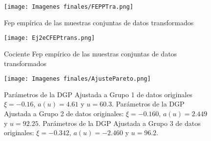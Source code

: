 \documentclass[10.5pt,notitlepage]{article}
\theoremstyle{plain}
\begin{document}
\begin{figure}[h]
    \centering
    \texttt{[image: Imagenes finales/FEPPTra.png]}
    \caption{Fep empírica de las muestras conjuntas de datos transformados}
    \label{Ej2eFEPtrans}
\end{figure}

\begin{figure}[h]
    \centering
    \texttt{[image: Ej2eCFEPtrans.png]}
    \caption{Cociente Fep empírico de las muestras conjuntas de datos transformados}
    \label{ZEj2eCFEPtransZ}
\end{figure}


\begin{figure}[htb]
    \centering
    \texttt{[image: Imagenes finales/AjustePareto.png]}
    \caption{Parámetros de la DGP Ajustada a Grupo 1 de datos originales \(\xi =-0.16\), \(a(u)=4.61\) y \(u = 60.3\). Parámetros de la DGP Ajustada a Grupo 2 de datos originales: \(\xi = -0.160\), \(a(u)=2.449\) y \(u = 92.25\).  Parámetros de la DGP Ajustada a Grupo 3 de datos originales: \(\xi =-0.342 \), \(a(u)=-2.460 \) y \(u = 96.2\).}
    \label{Mon1DGP} 
\end{figure}

\begin{comment}
\begin{figure}[h]
    \centering
    \texttt{[image: .png]}
    \caption{FEP empírica de las muestras conjuntas de los meses. Datos negativos.}
    \label{mEj2eFEP}
\end{figure}
\begin{figure}[h]
    \centering
    \texttt{[image: ]}
    \caption{Cociente FEP empírico de las muestras conjuntas de los meses. Datos negativos.}
    \label{mEj2eCFEP}
\end{figure}


\begin{figure}[h]
    \centering
    \texttt{[image: .png]}
    \caption{FEP empírico de las muestras conjuntas de los meses. Datos negativos.}
    \label{mEj2eCFEPZoom}
\end{figure}

\begin{figure}[h]
    \centering
    \texttt{[image: .png]}
    \caption{Cociente Fep empírico de las muestras conjuntas de datos transformados. Datos negativos.}
    \label{mEj2eCFEPtrans}
\end{figure}


\begin{figure}[htb]
    \centering
    \texttt{[image: .png]}
    \caption{Parámetros de la DGP Ajustada a Grupo 1 de datos negativos \(\xi =-0.16\), \(a(u)=4.61\) y \(u = 60.3\). Parámetros de la DGP Ajustada a Grupo 2 de datos negativos: \(\xi = -0.160\), \(a(u)=2.449\) y \(u = 92.25\).  Parámetros de la DGP Ajustada a Grupo 3 de datos negativos: \(\xi =-0.342 \), \(a(u)=-2.460 \) y \(u = 96.2\). Datos negativos.}
    \label{mMon1DGP} 
\end{figure}
\end{comment}
\end{document}
